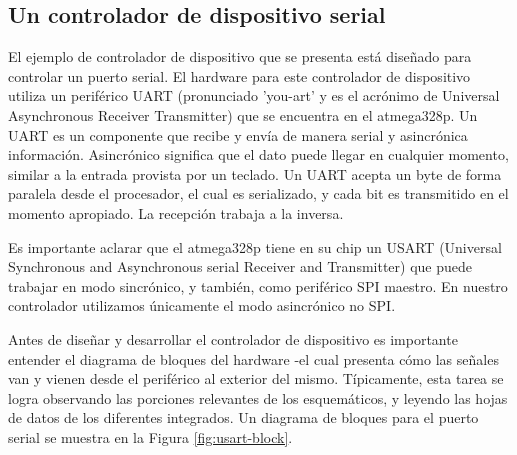 \documentclass[12pt]{article}
\begin{document}
\subsection *{Un controlador de dispositivo serial}

El ejemplo de controlador de dispositivo que se presenta está diseñado
para controlar un puerto serial. El hardware para este controlador
de dispositivo utiliza un periférico UART 
(pronunciado 'you-art' y es el acrónimo de
Universal Asynchronous Receiver Transmitter) que se encuentra en el atmega328p.
Un UART es un componente que recibe y envía de manera serial y asincrónica
información. Asincrónico significa que el dato puede llegar en cualquier
momento, similar a la entrada provista por un teclado. Un UART acepta
un byte de forma paralela desde el procesador, el cual es serializado,
y cada bit es transmitido en el momento apropiado. La recepción trabaja
a la inversa.

Es importante aclarar que el atmega328p tiene en su chip un USART (Universal Synchronous and Asynchronous serial Receiver and Transmitter) que puede trabajar
en modo sincrónico, y también, como periférico SPI maestro. En nuestro
controlador utilizamos únicamente el modo asincrónico no SPI.

Antes de diseñar y desarrollar el controlador de dispositivo 
es importante entender el diagrama de bloques del hardware -el cual
presenta cómo las señales van y vienen desde el periférico al exterior del mismo.
Típicamente, esta tarea se logra  observando las porciones relevantes de los
esquemáticos, y leyendo las hojas de datos de los diferentes integrados.
Un diagrama de bloques para el puerto serial se muestra en la Figura \ref{fig:usart-block}.
\end{document}
